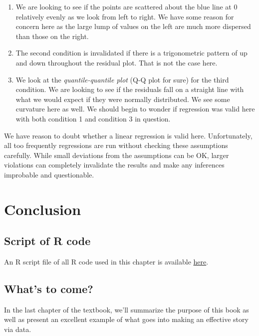 \documentclass[]{tufte-book}
\theoremstyle{definition}
\theoremstyle{definition}
\theoremstyle{remark}
\begin{document}
\begin{enumerate}
\def\labelenumi{\arabic{enumi}.}
\item
  We are looking to see if the points are scattered about the blue line
  at 0 relatively evenly as we look from left to right. We have some
  reason for concern here as the large lump of values on the left are
  much more dispersed than those on the right.
\item
  The second condition is invalidated if there is a trigonometric
  pattern of up and down throughout the residual plot. That is not the
  case here.
\item
  We look at the \emph{quantile-quantile plot} (Q-Q plot for sure) for
  the third condition. We are looking to see if the residuals fall on a
  straight line with what we would expect if they were normally
  distributed. We see some curvature here as well. We should begin to
  wonder if regression was valid here with both condition 1 and
  condition 3 in question.
\end{enumerate}

We have reason to doubt whether a linear regression is valid here.
Unfortunately, all too frequently regressions are run without checking
these assumptions carefully. While small deviations from the assumptions
can be OK, larger violations can completely invalidate the results and
make any inferences improbable and questionable.

\section{Conclusion}\label{conclusion-5}

\subsection{Script of R code}\label{script-of-r-code-5}

An R script file of all R code used in this chapter is available
\href{http://ismayc.github.io/moderndiver-book/scripts/09-regress.R}{here}.

\subsection{What's to come?}\label{whats-to-come-6}

In the last chapter of the textbook, we'll summarize the purpose of this
book as well as present an excellent example of what goes into making an
effective story via data.
\end{document}
